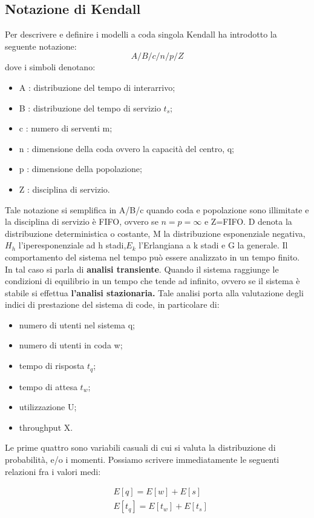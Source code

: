 \subsection{Notazione di Kendall} Per descrivere e definire i modelli a coda singola Kendall
ha introdotto la seguente notazione:
\[ A/B/c/n/p/Z\]
dove i simboli denotano:
\begin{itemize}
    \item A : distribuzione del tempo di interarrivo;
    \item B : distribuzione del tempo di servizio $t_s$;
    \item c : numero di serventi m;
    \item n : dimensione della coda ovvero la capacità del centro, q;
    \item p : dimensione della popolazione;
    \item  Z : disciplina di servizio.
\end{itemize}
 Tale notazione si semplifica in A/B/c quando coda e popolazione sono illimitate e
la disciplina di servizio è FIFO, ovvero se $n=p=\infty$ e Z=FIFO. D denota la distribuzione deterministica o costante, M la distribuzione esponenziale negativa,$H_h$ l’iperesponenziale ad h stadi,$E_k$ l’Erlangiana a k stadi e G la generale.
Il comportamento del sistema nel tempo può essere analizzato in un tempo finito.
In tal caso si parla di \textbf{analisi transiente}. Quando il sistema raggiunge le condizioni di
equilibrio in un tempo che tende ad infinito, ovvero se il sistema è stabile si effettua
\textbf{l’analisi stazionaria.} Tale analisi porta alla valutazione degli indici di prestazione del sistema di code, in particolare di:
\begin{itemize}
    \item numero di utenti nel sistema q;
    \item numero di utenti in coda w;
    \item tempo di risposta $t_q$;
    \item tempo di attesa $t_w$;
    \item utilizzazione U;
    \item throughput X.
\end{itemize}
Le prime quattro sono variabili casuali di cui si valuta la distribuzione di probabilità,
e/o i momenti. Possiamo scrivere immediatamente le seguenti
relazioni fra i valori medi:

\begin{align}
    & E[q] = E[w] + E[s]\\
    & E[t_q] = E[t_w] + E[t_s]
\end{align}

